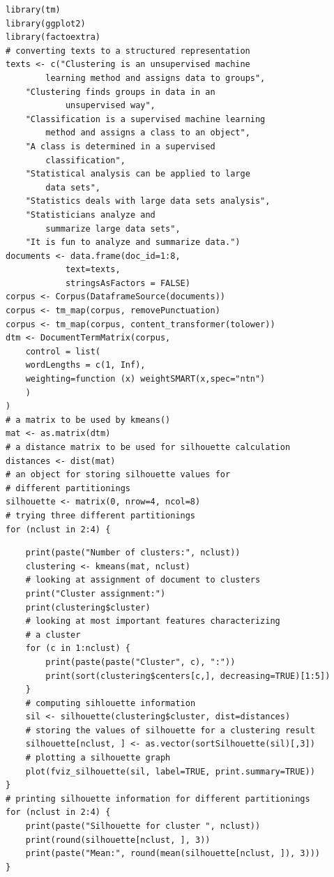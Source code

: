 \begin{verbatim}
library(tm)
library(ggplot2)
library(factoextra)
# converting texts to a structured representation
texts <- c("Clustering is an unsupervised machine
        learning method and assigns data to groups",
    "Clustering finds groups in data in an
            unsupervised way",
    "Classification is a supervised machine learning
        method and assigns a class to an object",
    "A class is determined in a supervised
        classification",
    "Statistical analysis can be applied to large
        data sets",
    "Statistics deals with large data sets analysis",
    "Statisticians analyze and
        summarize large data sets",
    "It is fun to analyze and summarize data.")
documents <- data.frame(doc_id=1:8,
            text=texts,
            stringsAsFactors = FALSE)
corpus <- Corpus(DataframeSource(documents))
corpus <- tm_map(corpus, removePunctuation)
corpus <- tm_map(corpus, content_transformer(tolower))
dtm <- DocumentTermMatrix(corpus,
    control = list(
    wordLengths = c(1, Inf),
    weighting=function (x) weightSMART(x,spec="ntn")
    )
)
# a matrix to be used by kmeans()
mat <- as.matrix(dtm)
# a distance matrix to be used for silhouette calculation
distances <- dist(mat)
# an object for storing silhouette values for
# different partitionings
silhouette <- matrix(0, nrow=4, ncol=8)
# trying three different partitionings
for (nclust in 2:4) {
\end{verbatim}

\begin{verbatim}
    print(paste("Number of clusters:", nclust))
    clustering <- kmeans(mat, nclust)
    # looking at assignment of document to clusters
    print("Cluster assignment:")
    print(clustering$cluster)
    # looking at most important features characterizing
    # a cluster
    for (c in 1:nclust) {
        print(paste(paste("Cluster", c), ":"))
        print(sort(clustering$centers[c,], decreasing=TRUE)[1:5])
    }
    # computing sihlouette information
    sil <- silhouette(clustering$cluster, dist=distances)
    # storing the values of silhouette for a clustering result
    silhouette[nclust, ] <- as.vector(sortSilhouette(sil)[,3])
    # plotting a silhouette graph
    plot(fviz_silhouette(sil, label=TRUE, print.summary=TRUE))
}
# printing silhouette information for different partitionings
for (nclust in 2:4) {
    print(paste("Silhouette for cluster ", nclust))
    print(round(silhouette[nclust, ], 3))
    print(paste("Mean:", round(mean(silhouette[nclust, ]), 3)))
}
\end{verbatim}

